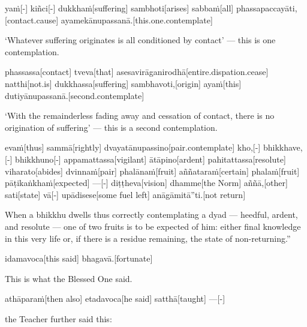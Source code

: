 \begin{samepage}
\begingl[glneveryline={\PaliGlossA,\PaliGlossB}]
yaṁ[-] kiñci[-] dukkhaṁ[suffering] sambhoti[arises] sabbaṁ[all] phassapaccayāti,[contact.cause] ayamekānupassanā.[this.one.contemplate]
\endgl
\nopagebreak
\linespread{0.5}
\begin{spacin}{0.2}
{\PaliGlossFT ‘Whatever suffering originates is all conditioned by contact’ — this is one contemplation.}
\end{spacin}
\vskip 12pt
\end{samepage}
\begin{samepage}
\begingl[glneveryline={\PaliGlossA,\PaliGlossB}]
phassassa[contact] tveva[that] asesavirāganirodhā[entire.dispation.cease] natthi[not.is] dukkhassa[suffering] sambhavoti,[origin] ayaṁ[this] dutiyānupassanā.[second.contemplate]
\endgl
\nopagebreak
\linespread{0.5}
\begin{spacin}{0.2}
{\PaliGlossFT ‘With the remainderless fading away and cessation of contact, there is no origination of suffering’ — this is a second contemplation.}
\end{spacin}
\vskip 12pt
\end{samepage}
\begin{samepage}
\begingl[glneveryline={\PaliGlossA,\PaliGlossB}]
evaṁ[thus] sammā[rightly] dvayatānupassino[pair.contemplate] kho,[-] bhikkhave,[-] bhikkhuno[-] appamattassa[vigilant] ātāpino[ardent] pahitattassa[resolute] viharato[abides] dvinnaṁ[pair] phalānaṁ[fruit] aññataraṁ[certain] phalaṁ[fruit] pāṭikaṅkhaṁ[expected] —[-] diṭṭheva[vision] dhamme[the Norm] aññā,[other] sati[state] vā[-] upādisese[some fuel left] anāgāmitā”ti.[not return]
\endgl
\nopagebreak
\linespread{0.5}
\begin{spacin}{0.2}
{\PaliGlossFT When a bhikkhu dwells thus correctly contemplating a dyad — heedful, ardent, and resolute — one of two fruits is to be expected of him: either final knowledge in this very life or, if there is a residue remaining, the state of non-returning.”}
\end{spacin}
\vskip 12pt
\end{samepage}
\begin{samepage}
\begingl[glneveryline={\PaliGlossA,\PaliGlossB}]
idamavoca[this said] bhagavā.[fortunate]
\endgl
\nopagebreak
\linespread{0.5}
\begin{spacin}{0.2}
{\PaliGlossFT This is what the Blessed One said.}
\end{spacin}
\vskip 12pt
\end{samepage}
\begin{samepage}
\begingl[glneveryline={\PaliGlossA,\PaliGlossB}]
athāparaṁ[then also] etadavoca[he said] satthā[taught] —[-]
\endgl
\nopagebreak
\linespread{0.5}
\begin{spacin}{0.2}
{\PaliGlossFT the Teacher further said this:}
\end{spacin}
\vskip 12pt
\end{samepage}
